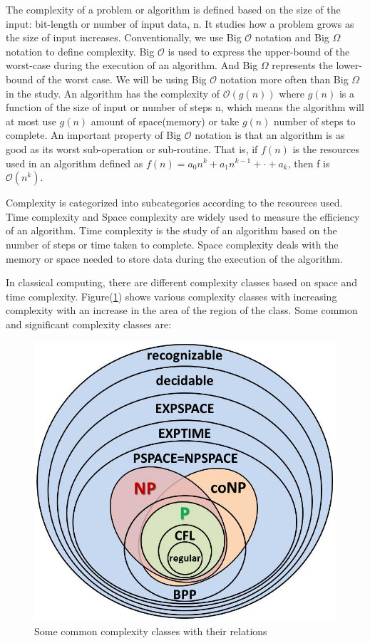 The complexity of a problem or algorithm is defined based on the size of the input: bit-length or number of input data, n. It studies how a problem grows as the size of input increases. Conventionally, we use Big $\mathcal{O}$ notation and Big $\Omega$ notation to define complexity. Big $\mathcal{O}$ is used to express the upper-bound of the worst-case during the execution of an algorithm. And Big $\Omega$ represents the lower-bound of the worst case. We will be using Big $\mathcal{O}$ notation more often than Big $\Omega$ in the study. An algorithm has the complexity of $\mathcal{O}(g(n))$ where $g(n)$ is a function of the size of input or number of steps n, which means the algorithm will at most use $g(n)$ amount of space(memory) or take $g(n)$ number of steps to complete. An important property of Big $\mathcal{O}$ notation is that an algorithm is as good as its worst sub-operation or sub-routine. That is, if $f(n)$ is the resources used in an algorithm defined as $f(n)= a_0n^k + a_1n^{k-1}+ \cdot + a_k$, then f is $\mathcal{O}(n^k)$.

Complexity is categorized into subcategories according to the resources used. Time complexity and Space complexity are widely used to measure the efficiency of an algorithm. Time complexity is the study of an algorithm based on the number of steps or time taken to complete. Space complexity deals with the memory or space needed to store data during the execution of the algorithm.
 
In classical computing, there are different complexity classes based on space and time complexity. Figure(\ref{fig: Complexity classesI}) shows various complexity classes with increasing complexity with an increase in the area of the region of the class. Some common and significant complexity classes are:
\begin{figure}[H]
    \centering
    \includegraphics[scale=0.4]{figures/Complexity-classes-diagram.jpg}
    \caption{Some common complexity classes with their relations \protect\cite{complex_classesI}}
    \label{fig: Complexity classesI}
\end{figure}
 
